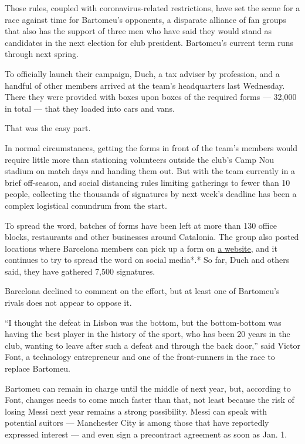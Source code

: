 Those rules, coupled with coronavirus-related restrictions, have set the
scene for a race against time for Bartomeu's opponents, a disparate
alliance of fan groups that also has the support of three men who have
said they would stand as candidates in the next election for club
president. Bartomeu's current term runs through next spring.

To officially launch their campaign, Duch, a tax adviser by profession,
and a handful of other members arrived at the team's headquarters last
Wednesday. There they were provided with boxes upon boxes of the
required forms --- 32,000 in total --- that they loaded into cars and
vans.

That was the easy part.

In normal circumstances, getting the forms in front of the team's
members would require little more than stationing volunteers outside the
club's Camp Nou stadium on match days and handing them out. But with the
team currently in a brief off-season, and social distancing rules
limiting gatherings to fewer than 10 people, collecting the thousands of
signatures by next week's deadline has been a complex logistical
conundrum from the start.

To spread the word, batches of forms have been left at more than 130
office blocks, restaurants and other businesses around Catalonia. The
group also posted locations where Barcelona members can pick up a form
on \href{https://www.mocio2020.cat/en/where-to-sign/}{a website}, and it
continues to try to spread the word on social media*.* So far, Duch and
others said, they have gathered 7,500 signatures.

Barcelona declined to comment on the effort, but at least one of
Bartomeu's rivals does not appear to oppose it.

``I thought the defeat in Lisbon was the bottom, but the bottom-bottom
was having the best player in the history of the sport, who has been 20
years in the club, wanting to leave after such a defeat and through the
back door,'' said Victor Font, a technology entrepreneur and one of the
front-runners in the race to replace Bartomeu.

Bartomeu can remain in charge until the middle of next year, but,
according to Font, changes needs to come much faster than that, not
least because the risk of losing Messi next year remains a strong
possibility. Messi can speak with potential suitors --- Manchester City
is among those that have reportedly expressed interest --- and even sign
a precontract agreement as soon as Jan. 1.

